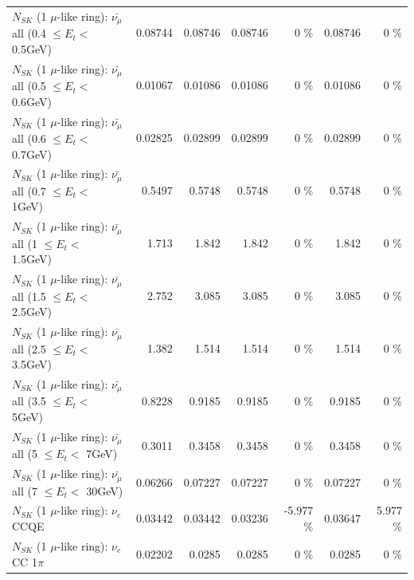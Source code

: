\begin{table}
\begin{tabular}{| l | r | r | r  r | r  r |}
 $N_{SK}$ (1 $\mu$-like ring): $\bar{\nu_{\mu}}$ all (0.4 $\leq E_{t} <$ 0.5GeV) &         0.08744 &         0.08746 &         0.08746 &        0 \%  &         0.08746 &        0 \%  \\ 
 $N_{SK}$ (1 $\mu$-like ring): $\bar{\nu_{\mu}}$ all (0.5 $\leq E_{t} <$ 0.6GeV) &         0.01067 &         0.01086 &         0.01086 &        0 \%  &         0.01086 &        0 \%  \\ 
 $N_{SK}$ (1 $\mu$-like ring): $\bar{\nu_{\mu}}$ all (0.6 $\leq E_{t} <$ 0.7GeV) &         0.02825 &         0.02899 &         0.02899 &        0 \%  &         0.02899 &        0 \%  \\ 
   $N_{SK}$ (1 $\mu$-like ring): $\bar{\nu_{\mu}}$ all (0.7 $\leq E_{t} <$ 1GeV) &          0.5497 &          0.5748 &          0.5748 &        0 \%  &          0.5748 &        0 \%  \\ 
   $N_{SK}$ (1 $\mu$-like ring): $\bar{\nu_{\mu}}$ all (1 $\leq E_{t} <$ 1.5GeV) &           1.713 &           1.842 &           1.842 &        0 \%  &           1.842 &        0 \%  \\ 
 $N_{SK}$ (1 $\mu$-like ring): $\bar{\nu_{\mu}}$ all (1.5 $\leq E_{t} <$ 2.5GeV) &           2.752 &           3.085 &           3.085 &        0 \%  &           3.085 &        0 \%  \\ 
 $N_{SK}$ (1 $\mu$-like ring): $\bar{\nu_{\mu}}$ all (2.5 $\leq E_{t} <$ 3.5GeV) &           1.382 &           1.514 &           1.514 &        0 \%  &           1.514 &        0 \%  \\ 
   $N_{SK}$ (1 $\mu$-like ring): $\bar{\nu_{\mu}}$ all (3.5 $\leq E_{t} <$ 5GeV) &          0.8228 &          0.9185 &          0.9185 &        0 \%  &          0.9185 &        0 \%  \\ 
     $N_{SK}$ (1 $\mu$-like ring): $\bar{\nu_{\mu}}$ all (5 $\leq E_{t} <$ 7GeV) &          0.3011 &          0.3458 &          0.3458 &        0 \%  &          0.3458 &        0 \%  \\ 
    $N_{SK}$ (1 $\mu$-like ring): $\bar{\nu_{\mu}}$ all (7 $\leq E_{t} <$ 30GeV) &         0.06266 &         0.07227 &         0.07227 &        0 \%  &         0.07227 &        0 \%  \\ 
\hline
\hline
\hline
                                      $N_{SK}$ (1 $\mu$-like ring): $\nu_e$ CCQE &         0.03442 &         0.03442 &         0.03236 &   -5.977 \%  &         0.03647 &    5.977 \%  \\ 
                                 $N_{SK}$ (1 $\mu$-like ring): $\nu_e$ CC 1$\pi$ &         0.02202 &          0.0285 &          0.0285 &        0 \%  &          0.0285 &        0 \%  \\ 

\end{tabular}
\end{table}
